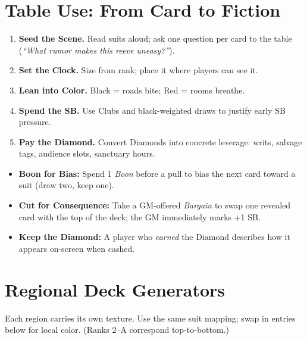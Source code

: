 \begin{multicols}{2}
\section{Table Use: From Card to Fiction}
\begin{enumerate}
  \item \textbf{Seed the Scene.} Read suits aloud; ask one question per card to the table (\emph{“What rumor makes this reeve uneasy?”}).
  \item \textbf{Set the Clock.} Size from rank; place it where players can see it.
  \item \textbf{Lean into Color.} Black = roads bite; Red = rooms breathe.
  \item \textbf{Spend the SB.} Use Clubs and black-weighted draws to justify early SB pressure.
  \item \textbf{Pay the Diamond.} Convert Diamonds into concrete leverage: writs, salvage tags, audience slots, sanctuary hours.
\end{enumerate}

\begin{tcolorbox}[colback=blue!5!white,colframe=blue!75!black,title=Player Options with Cards,fonttitle=\bfseries]
\begin{itemize}
  \item \textbf{Boon for Bias:} Spend 1 \emph{Boon} before a pull to bias the next card toward a suit (draw two, keep one).
  \item \textbf{Cut for Consequence:} Take a GM-offered \emph{Bargain} to swap one revealed card with the top of the deck; the GM immediately marks +1 SB.
  \item \textbf{Keep the Diamond:} A player who \emph{earned} the Diamond describes how it appears on-screen when cashed.
\end{itemize}
\end{tcolorbox}

\section{Regional Deck Generators}
Each region carries its own texture. Use the same suit mapping; swap in entries below for local color. (Ranks 2–A correspond top-to-bottom.)


\end{multicols}
